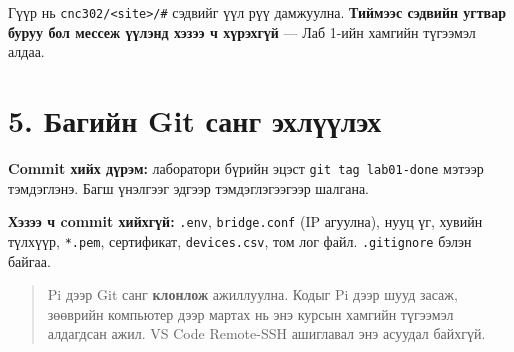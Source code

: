 Гүүр нь \texttt{cnc302/\allowbreak{}\textless{}site\textgreater{}/\allowbreak{}\#} сэдвийг үүл рүү дамжуулна. \textbf{Тиймээс сэдвийн угтвар буруу бол мессеж үүлэнд хэзээ ч хүрэхгүй} --- Лаб 1-ийн хамгийн түгээмэл алдаа.

\hypertarget{ux431ux430ux433ux438ux439ux43d-git-ux441ux430ux43dux433-ux44dux445ux43bux4afux4afux43bux44dux445}{%
\section{5. Багийн Git санг эхлүүлэх}\label{ux431ux430ux433ux438ux439ux43d-git-ux441ux430ux43dux433-ux44dux445ux43bux4afux4afux43bux44dux445}}

\begin{Shaded}
\begin{Highlighting}[]
\OperatorTok{\textless{}}\OperatorTok{\textgreater{}}
\OperatorTok{\textless{}}\OperatorTok{\textgreater{}}
 \OperatorTok{\textless{}}\OperatorTok{\textgreater{}}
\KeywordTok{\&\&} \KeywordTok{\&\&} \KeywordTok{\&\&} 

\OperatorTok{\textless{}}\OperatorTok{\textgreater{}}

\end{Highlighting}
\end{Shaded}

\textbf{Commit хийх дүрэм:} лаборатори бүрийн эцэст \texttt{git\ tag\ lab01-done} мэтээр тэмдэглэнэ. Багш үнэлгээг эдгээр тэмдэглэгээгээр шалгана.

\textbf{Хэзээ ч commit хийхгүй:} \texttt{.env}, \texttt{bridge.conf} (IP агуулна), нууц үг, хувийн түлхүүр, \texttt{*.pem}, сертификат, \texttt{devices.csv}, том лог файл. \texttt{.gitignore} бэлэн байгаа.

\begin{quote}
Pi дээр Git санг \textbf{клонлож} ажиллуулна. Кодыг Pi дээр шууд засаж, зөөврийн компьютер дээр мартах нь энэ курсын хамгийн түгээмэл алдагдсан ажил. VS Code Remote-SSH ашиглавал энэ асуудал байхгүй.
\end{quote}

